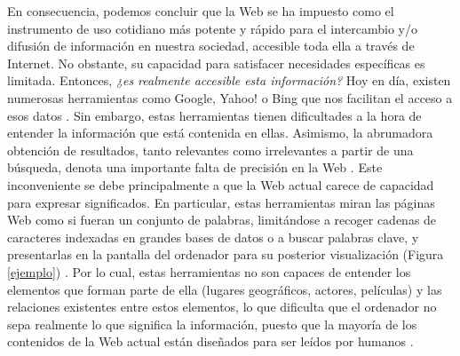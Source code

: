 



En consecuencia, podemos concluir que la Web se ha impuesto como el instrumento de uso cotidiano más potente y rápido para el intercambio y/o difusión de información en nuestra sociedad, accesible toda ella a través de Internet. No obstante, su capacidad para satisfacer necesidades específicas es limitada. Entonces, \textit{¿es realmente accesible esta información?} Hoy en día, existen numerosas herramientas como Google, Yahoo! o Bing que nos facilitan el acceso a esos datos \cite{semantica-web}. Sin embargo, estas herramientas tienen dificultades a la hora de entender la información que está contenida en ellas. Asimismo, la abrumadora obtención de resultados, tanto relevantes como irrelevantes a partir de una búsqueda, denota una importante falta de precisión en la Web \cite{coursera}. Este inconveniente se debe principalmente a que la Web actual carece de capacidad para expresar significados. En particular, estas herramientas miran las páginas Web como si fueran un conjunto de palabras, limitándose a recoger cadenas de caracteres indexadas en grandes bases de datos o a buscar palabras clave, y presentarlas en la pantalla del ordenador para su posterior visualización (Figura \ref{ejemplo}) \cite{web-semantica-w3c}. Por lo cual, estas herramientas no son capaces de entender los elementos que forman parte de ella (lugares geográficos, actores, películas) y las relaciones existentes entre estos elementos, lo que dificulta que el ordenador no sepa realmente lo que significa la información, puesto que la mayoría de los contenidos de la Web actual están diseñados para ser leídos por humanos \cite{apuntes-clase-jose}. \\

